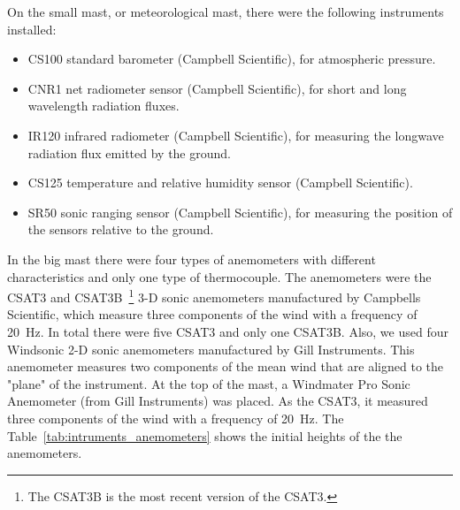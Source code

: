 On the small mast, or meteorological mast, there were the following instruments installed: 
\begin{itemize}
    \item CS100 standard barometer (Campbell Scientific), for atmospheric pressure.
    \item CNR1 net radiometer sensor (Campbell Scientific), for short and long wavelength radiation fluxes.
    \item IR120 infrared radiometer (Campbell Scientific), for measuring the longwave radiation flux emitted by the ground.
    \item CS125 temperature and relative humidity sensor (Campbell Scientific).
    \item SR50 sonic ranging sensor (Campbell Scientific), for measuring the position of the sensors relative to the ground.
\end{itemize}

In the big mast there were four types of anemometers with different characteristics and only one type of thermocouple. The anemometers were the CSAT3 and CSAT3B~\footnote{The CSAT3B is the most recent version of the CSAT3.} 3-D sonic anemometers manufactured by Campbells Scientific, which measure three components of the wind with a frequency of 20~Hz. In total there were five CSAT3 and only one CSAT3B. Also, we used four Windsonic 2-D sonic anemometers manufactured by Gill Instruments. This anemometer measures two components of the mean wind that are aligned to the "plane" of the instrument. At the top of the mast, a Windmater Pro Sonic Anemometer (from Gill Instruments) was placed. As the CSAT3, it measured three components of the wind with a frequency of 20~Hz. The Table~\ref{tab:intruments_anemometers} shows the initial heights of the the anemometers.

